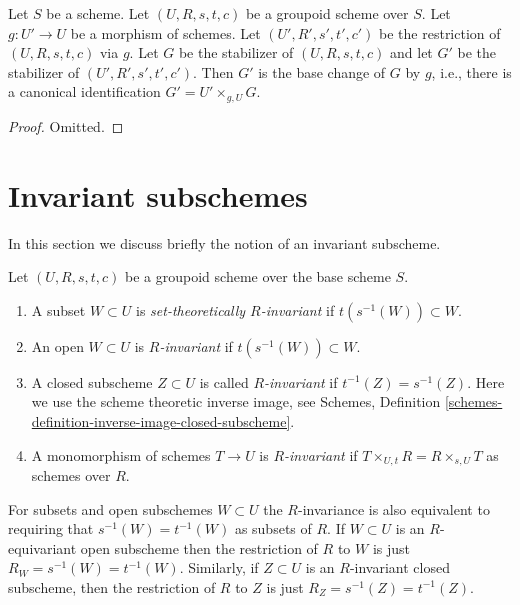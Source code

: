 \begin{lemma}
\label{lemma-restrict-stabilizer}
Let $S$ be a scheme.
Let $(U, R, s, t, c)$ be a groupoid scheme over $S$.
Let $g : U' \to U$ be a morphism of schemes.
Let $(U', R', s', t', c')$ be the restriction of $(U, R, s, t, c)$ via $g$.
Let $G$ be the stabilizer of $(U, R, s, t, c)$ and let
$G'$ be the stabilizer of $(U', R', s', t', c')$.
Then $G'$ is the base change of $G$ by $g$, i.e.,
there is a canonical identification $G' = U' \times_{g, U} G$.
\end{lemma}

\begin{proof}
Omitted.
\end{proof}






\section{Invariant subschemes}
\label{section-invariant}

\noindent
In this section we discuss briefly the notion of an invariant subscheme.

\begin{definition}
\label{definition-invariant-open}
Let $(U, R, s, t, c)$ be a groupoid scheme over the base scheme $S$.
\begin{enumerate}
\item A subset $W \subset U$ is {\it set-theoretically $R$-invariant}
if $t(s^{-1}(W)) \subset W$.
\item An open $W \subset U$ is {\it $R$-invariant} if
$t(s^{-1}(W)) \subset W$.
\item A closed subscheme $Z \subset U$ is called {\it $R$-invariant}
if $t^{-1}(Z) = s^{-1}(Z)$. Here we use the scheme theoretic inverse image, see
Schemes, Definition \ref{schemes-definition-inverse-image-closed-subscheme}.
\item A monomorphism of schemes $T \to U$ is {\it $R$-invariant} if
$T \times_{U, t} R = R \times_{s, U} T$ as schemes over $R$.
\end{enumerate}
\end{definition}

\noindent
For subsets and open subschemes $W \subset U$ the $R$-invariance
is also equivalent to requiring that $s^{-1}(W) = t^{-1}(W)$
as subsets of $R$. If $W \subset U$ is an $R$-equivariant open subscheme
then the restriction of $R$ to $W$ is just $R_W = s^{-1}(W) = t^{-1}(W)$.
Similarly, if $Z \subset U$ is an $R$-invariant closed subscheme, then
the restriction of $R$ to $Z$ is just $R_Z = s^{-1}(Z) = t^{-1}(Z)$.

